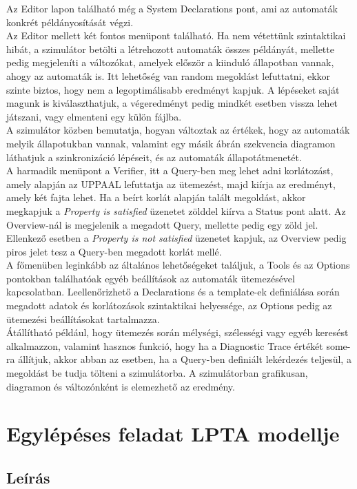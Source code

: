\documentclass {report}
\begin{document}
Az Editor lapon található még a System Declarations pont, ami az automaták konkrét példányosítását végzi.\\
Az Editor mellett két fontos menüpont található. Ha nem vétettünk szintaktikai hibát, a szimulátor betölti a létrehozott automaták összes példányát, mellette pedig megjeleníti a változókat, amelyek először a kiinduló állapotban vannak, ahogy az automaták is. Itt lehetőség van random megoldást lefuttatni, ekkor szinte biztos, hogy nem a legoptimálisabb eredményt kapjuk. A lépéseket saját magunk is kiválaszthatjuk, a végeredményt pedig mindkét esetben vissza lehet játszani, vagy elmenteni egy külön fájlba.  \\
A szimulátor közben bemutatja, hogyan változtak az értékek, hogy az automaták melyik állapotukban vannak, valamint egy másik ábrán szekvencia diagramon láthatjuk a szinkronizáció lépéseit, és az automaták állapotátmenetét.\\
A harmadik menüpont a Verifier, itt a Query-ben meg lehet adni korlátozást, amely alapján az UPPAAL lefuttatja az ütemezést, majd kiírja az eredményt, amely két fajta lehet. Ha a beírt korlát alapján talált megoldást, akkor megkapjuk a \emph{Property is satisfied} üzenetet zölddel kiírva a Status pont alatt. Az Overview-nál is megjelenik a megadott Query, mellette pedig egy zöld jel. Ellenkező esetben a \emph{Property is not satisfied} üzenetet kapjuk, az Overview pedig piros jelet tesz a Query-ben megadott korlát mellé.    \\
A főmenüben leginkább az általános lehetőségeket találjuk, a Tools és az Options pontokban találhatóak egyéb beállítások az automaták ütemezésével kapcsolatban. Leellenőrizhető a Declarations és a template-ek definiálása során megadott adatok és korlátozások szintaktikai helyessége, az Options pedig az ütemezési beállításokat tartalmazza. \\
Átállítható például, hogy ütemezés során mélységi, szélességi vagy egyéb keresést alkalmazzon, valamint hasznos funkció, hogy ha a Diagnostic Trace értékét some-ra állítjuk, akkor abban az esetben, ha a Query-ben definiált lekérdezés teljesül, a megoldást be tudja tölteni a szimulátorba. A szimulátorban grafikusan, diagramon és változónként is elemezhető az eredmény.   

\chapter{Egylépéses feladat LPTA modellje}
    \section{Leírás}
    
\end{document}
